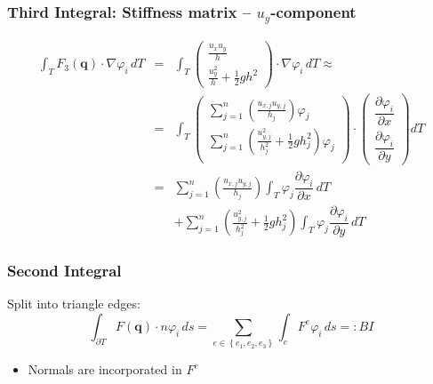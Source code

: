 \documentclass{beamer}
\newcommand{\pd}[2]{\dfrac{\partial #1}{\partial #2}}
\renewcommand{\phi}{\varphi}
\begin{document}
\begin{frame}
  \frametitle{Third Integral: Stiffness matrix -- $u_y$-component}
  \begin{eqnarray*}
    \int_T F_3\left(\mathbf{q}\right) \cdot \nabla \phi_i \, dT &=&
    \int_T
    \begin{pmatrix}
      \frac{u_x u_y}{h} \\ \frac{u_y^2}{h} + \frac{1}{2} g h^2 
    \end{pmatrix}
    \cdot \nabla \phi_i \, dT \approx \\
    &=& \int_T 
    \begin{pmatrix}
      \sum_{j=1}^n \left(\frac{u_{x,j} u_{y,j}}{h_j}\right) \phi_j \\
      \sum_{j=1}^n \left(\frac{u_{y,j}^2}{h_j^2} + \frac{1}{2} g h_j^2\right) \phi_j \\
    \end{pmatrix}
    \cdot 
    \begin{pmatrix}
      \pd{\phi_i}{x} \\
      \pd{\phi_i}{y} 
    \end{pmatrix} dT \\
    &=& \sum_{j=1}^n \left(\frac{u_{x,j} u_{y,j}}{h_j}\right) \int_T \phi_j \pd{\phi_i}{x} \, dT \\
    &&+ \sum_{j=1}^n \left(\frac{u_{y,j}^2}{h_j^2} + \frac{1}{2} g h_j^2\right) \int_T \phi_j \pd{\phi_i}{y} \, dT
  \end{eqnarray*}

\end{frame}

\begin{frame}
  \frametitle{Second Integral}
  Split into triangle edges:
  \begin{equation}
    \label{eq:border-integral-sum}
    \int_{\partial T} F(\mathbf{q}) \cdot n \phi_i \, ds = \sum_{e\in\left\{ e_1,e_2,e_3 \right\}} \int_{e} F^e \phi_i \, ds =: BI
  \end{equation}
  \begin{itemize}
  \item Normals are incorporated in $F^e$
  \end{itemize}
\end{frame}
\end{document}
